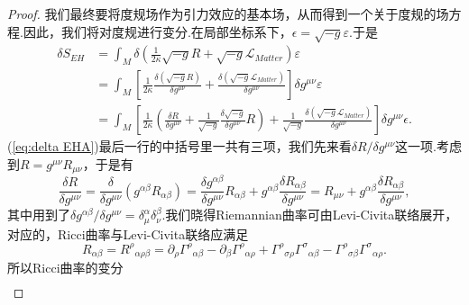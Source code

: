 \begin{proof}
    我们最终要将度规场作为引力效应的基本场，从而得到一个关于度规的场方程.因此，我们将对度规进行变分.在局部坐标系下，$\epsilon=\sqrt{-g}\varepsilon$.于是
    \begin{equation}
        \begin{split}\label{eq:delta EHA}
            \delta S_{EH}&=\int_M\delta\left(\frac{1}{2\kappa}\sqrt{-g}R+\sqrt{-g}\mathcal{L} _{Matter}\right)\varepsilon\\
            &=\int_M\left[\frac{1}{2\kappa}\frac{\delta\left(\sqrt{-g}R\right)}{\delta g^{\mu\nu}}+\frac{\delta\left(\sqrt{-g}\mathcal{L} _{Matter}\right)}{\delta g^{\mu\nu}}\right]\delta g^{\mu\nu}\varepsilon\\
            &=\int_M\left[\frac{1}{2\kappa}\left(\frac{\delta R}{\delta g^{\mu\nu}}+\frac{1}{\sqrt{-g}}\frac{\delta\sqrt{-g}}{\delta g^{\mu\nu}}R\right)+\frac{1}{\sqrt{-g}}\frac{\delta\left(\sqrt{-g}\mathcal{L} _{Matter}\right)}{\delta g^{\mu\nu}}\right]\delta g^{\mu\nu}\epsilon.
        \end{split}
    \end{equation}
    (\ref{eq:delta EHA})最后一行的中括号里一共有三项，我们先来看$\delta R/\delta g^{\mu\nu}$这一项.考虑到$R=g^{\mu\nu}R_{\mu\nu}$，于是有
    $$\frac{\delta R}{\delta g^{\mu\nu}}=\frac{\delta }{\delta g^{\mu\nu}}\left(g^{\alpha\beta}{R}_{\alpha\beta}\right)=\frac{\delta g^{\alpha\beta}}{\delta g^{\mu\nu}}{R}_{\alpha\beta}+g^{\alpha\beta}\frac{\delta {R}_{\alpha\beta}}{\delta g^{\mu\nu}}={R}_{\mu\nu}+g^{\alpha\beta}\frac{\delta {R}_{\alpha\beta}}{\delta g^{\mu\nu}},$$
    其中用到了${\delta g^{\alpha\beta}}/{\delta g^{\mu\nu}}=\delta^\alpha_\mu\delta^\beta_\nu$.我们晓得Riemannian曲率可由Levi-Civita联络展开，对应的，Ricci曲率与Levi-Civita联络应满足
    $${R}_{\alpha\beta}={R^\rho}_{\alpha\rho\beta}=\partial_\rho{\varGamma^\rho}_{\alpha\beta}-\partial_\beta{\varGamma^\rho}_{\alpha\rho}+{\varGamma^\rho}_{\sigma\rho}{\varGamma^\sigma}_{\alpha\beta}-{\varGamma^\rho}_{\sigma\beta}{\varGamma^\sigma}_{\alpha\rho}.$$
    所以Ricci曲率的变分
    \begin{eqnarray*}

\end{eqnarray*}
\end{proof}
